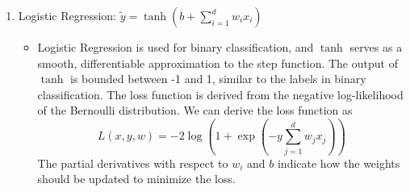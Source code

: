\documentclass{article}
\begin{document}
\begin{enumerate}
    \item Logistic Regression: $\tilde{y} = \tanh(b + \sum_{i=1}^{d} w_i x_i)$
    \begin{itemize}
        \item Logistic Regression is used for binary classification, and $\tanh$ serves as a smooth, differentiable approximation to the step function.
        The output of $\tanh$ is bounded between -1 and 1, similar to the labels in binary classification.
        The loss function is derived from the negative log-likelihood of the Bernoulli distribution.
        We can derive the loss function as \[L(x, y, w) = -2\log\left(1 + \exp\left(-y \sum_{j=1}^{d} w_j x_j\right)\right)\]
        The partial derivatives with respect to $w_i$ and $b$ indicate how the weights should be updated to minimize the loss.
    \end{itemize}
\end{enumerate}
\end{document}
